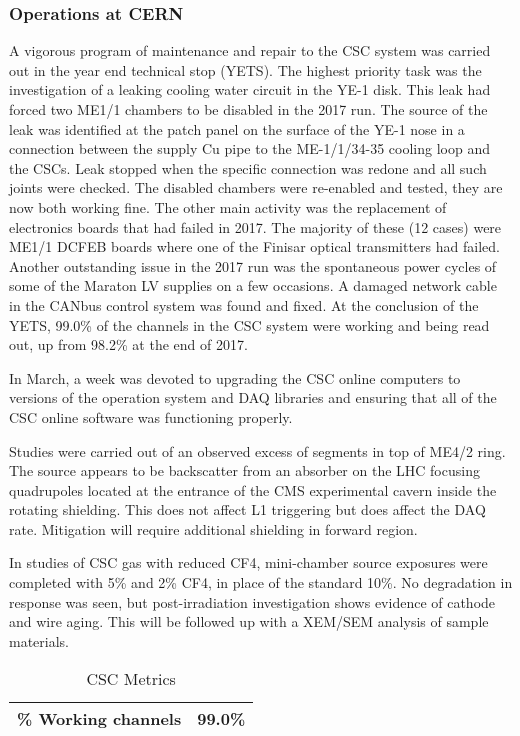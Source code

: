 \documentclass[12pt]{article}
\begin{document}
\subsubsection{Operations at CERN}
A vigorous program of maintenance and repair to the CSC system was carried out in the  year end technical stop (YETS).  The highest priority task was the investigation of a leaking cooling water circuit 
in the YE-1 disk.  This leak had forced two ME1/1 chambers to be disabled in the 2017 
run.  The source of the leak was identified at the patch panel on the surface of the YE-1 nose in a
connection between the supply Cu pipe to the ME-1/1/34-35 cooling loop and the CSCs. 
Leak stopped when the specific connection was redone 
and all such joints were checked.  The disabled chambers were re-enabled and tested, they are now both working fine.
The other main activity was the replacement of electronics boards that had failed in 2017.  The majority of these (12 cases) were ME1/1 DCFEB boards where one of the Finisar optical transmitters had failed. 
Another outstanding issue in the 2017 run was the spontaneous power cycles of some of the Maraton LV supplies on a few occasions. A damaged network cable in the CANbus control system was found and fixed. 
At the conclusion of the YETS, 99.0\% of the channels in the CSC system were working and being read out, up from 98.2\% at the end of 2017.

In March, a week was devoted to upgrading the CSC online computers to versions of the operation system and DAQ libraries and ensuring that all of the CSC online software was functioning properly.

 
Studies were carried out of an observed excess of segments in top of ME4/2 ring.
The source appears to be backscatter from an absorber on the LHC focusing  quadrupoles located at the entrance of the CMS experimental cavern inside the rotating shielding.
This does not affect L1 triggering but does affect the DAQ rate.
Mitigation will require additional shielding in forward region.

In studies of CSC gas with reduced CF4, mini-chamber source exposures were completed with 5\% and 2\% CF4, in place of the standard 10\%. No degradation in response was seen, but post-irradiation investigation shows evidence of cathode and wire aging.  This will be followed up with a XEM/SEM analysis of sample materials. 


\begin{table}[htp]
\caption{CSC Metrics}
\begin{center}
\begin{tabular}{|l|c|}
\hline
 \% Working channels &  99.0\% \\
\hline
\end{tabular}
\end{center}
\label{CSCMetrics}
\end{table}%
\end{document}
